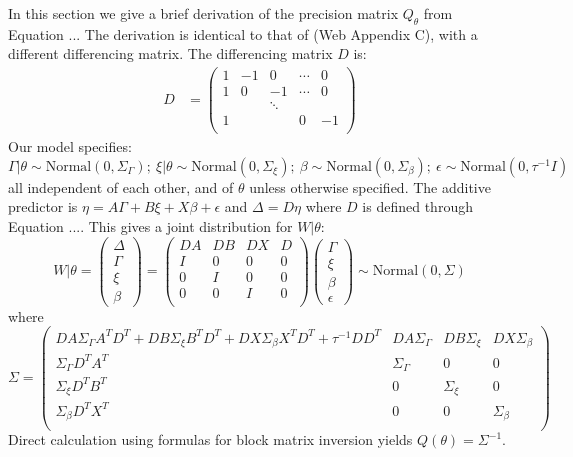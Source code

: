 \documentclass[AMA,STIX1COL,doublespace]{WileyNJD-v2}
\begin{document}
In this section we give a brief derivation of the precision matrix $Q_{\theta}$ from Equation ... The derivation is identical to that of \cite{casecross} (Web Appendix C), with a different differencing matrix. The differencing matrix $D$ is:
\begin{equation}\begin{aligned}\label{eqn:D2}
D &= \begin{pmatrix}
1 & -1 & 0 & \cdots & 0 \\
1 & 0 & -1 & \cdots & 0 \\
  &    & \ddots &   &   \\
1 &    &       & 0 & -1 \\
\end{pmatrix}
\end{aligned}\end{equation}
Our model specifies:
\begin{equation*}
\Gamma|\theta \sim \text{Normal}\left( 0,\Sigma_{\Gamma}\right); \ \xi|\theta \sim \text{Normal}\left( 0,\Sigma_{\xi}\right); \ \beta \sim \text{Normal}\left( 0,\Sigma_{\beta}\right); \ \epsilon \sim \text{Normal}\left( 0,\tau^{-1}I\right)
\end{equation*}
all independent of each other, and of $\theta$ unless otherwise specified. The additive predictor is $\eta = A\Gamma + B\xi + X\beta + \epsilon$ and $\Delta = D\eta$ where $D$ is defined through Equation .... This gives a joint distribution for $W|\theta$:
\begin{equation*}
W|\theta = \begin{pmatrix} \Delta \\ \Gamma \\ \xi \\\beta \end{pmatrix} = \begin{pmatrix} DA & DB & DX & D \\ I & 0 & 0 & 0 \\ 0 & I & 0 & 0 \\ 0 & 0 & I & 0 \\ \end{pmatrix}\begin{pmatrix}\Gamma\\ \xi \\ \beta \\ \epsilon \end{pmatrix} 
\sim \text{Normal}\left( 0,\Sigma\right)
\end{equation*}
where
\begin{equation*}
\Sigma = \begin{pmatrix}
DA\Sigma_{\Gamma}A^{T}D^{T} + DB\Sigma_{\xi}B^{T}D^{T} + DX\Sigma_{\beta}X^{T}D^{T} + \tau^{-1}DD^{T} & DA\Sigma_{\Gamma} & DB\Sigma_{\xi} & DX\Sigma_{\beta} \\
\Sigma_{\Gamma}D^{T}A^{T} & \Sigma_{\Gamma} & 0 & 0 \\
\Sigma_{\xi}D^{T}B^{T} & 0 & \Sigma_{\xi} & 0 \\
\Sigma_{\beta}D^{T}X^{T} & 0 & 0 & \Sigma_{\beta} \\
\end{pmatrix}
\end{equation*}
Direct calculation using formulas for block matrix inversion yields $Q(\theta) = \Sigma^{-1}$.


\nocite{*}%
%

\clearpage
\end{document}
